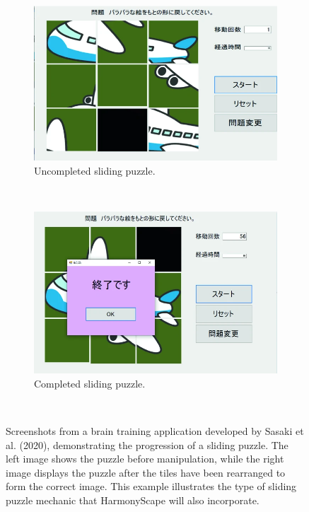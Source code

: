 \documentclass{l4proj}
\begin{document}
\begin{figure}[h]
    \centering
    \begin{subfigure}[b]{0.45\textwidth}
        \includegraphics[width=\textwidth]{dissertation/images/uncompleted_sliding.png}
        \caption{Uncompleted sliding puzzle.}
        \label{fig:slide_uncompleted}
    \end{subfigure}
    ~ 
    \begin{subfigure}[b]{0.45\textwidth}
        \includegraphics[width=\textwidth]{dissertation/images/completed_sliding.png}
        \caption{Completed sliding puzzle.}
        \label{fig:slide_completed}
    \end{subfigure}
    ~  
    \caption{Screenshots from a brain training application developed by Sasaki et al. (2020), demonstrating the progression of a sliding puzzle. The left image shows the puzzle before manipulation, while the right image displays the puzzle after the tiles have been rearranged to form the correct image. This example illustrates the type of sliding puzzle mechanic that HarmonyScape will also incorporate.
    }\label{fig:sliding_puzzle}
\end{figure}
\end{document}

